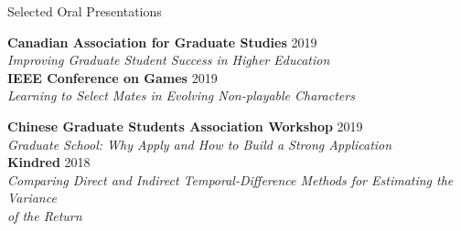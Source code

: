 \documentclass{cv}
\begin{document}

\begin{rSection}{Selected Oral Presentations}

{\bf Canadian Association for Graduate Studies} \hfill 2019 \vspace{0.1em}\\
{\em Improving Graduate Student Success in Higher Education} \vspace{0.5em}\\
{\bf IEEE Conference on Games} \hfill 2019 \vspace{0.1em}\\
{\em Learning to Select Mates in Evolving Non-playable Characters} \vspace{0.5em}\\

\pagebreak

{\bf Chinese Graduate Students Association Workshop} \hfill 2019 \vspace{0.1em}\\
{\em Graduate School: Why Apply and How to Build a Strong Application} \vspace{0.5em}\\
{\bf Kindred} \hfill 2018 \vspace{0.1em}\\
{\em Comparing Direct and Indirect Temporal-Difference Methods for Estimating the Variance\\of the Return}

\end{rSection}

\end{document}
